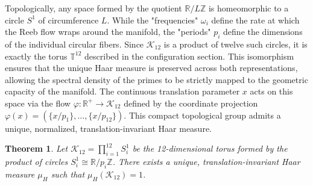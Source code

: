 \documentclass[sn-mathphys-num, pdflatex]{sn-jnl}
\newtheorem{theorem}{Theorem}[section]
\begin{document}
Topologically, any space formed by the quotient $\mathbb{R}/L\mathbb{Z}$ is homeomorphic to a circle $S^1$ of circumference $L$. While the "frequencies" $\omega_i$ define the rate at which the Reeb flow wraps around the manifold, the "periods" $p_i$ define the dimensions of the individual circular fibers. Since $\mathcal{K}_{12}$ is a product of twelve such circles, it is exactly the torus $\mathbb{T}^{12}$ described in the configuration section. This isomorphism ensures that the unique Haar measure is preserved across both representations, allowing the spectral density of the primes to be strictly mapped to the geometric capacity of the manifold.
The continuous translation parameter $x$ acts on this space via the flow $\varphi : \mathbb{R}^+ \to \mathcal{K}_{12}$ defined by the coordinate projection $\varphi(x) = ( \{x/p_1\}, \dots, \{x/p_{12}\} )$. This compact topological group admits a unique, normalized, translation-invariant Haar measure.
\begin{theorem}
Let $\mathcal{K}_{12} = \prod_{i=1}^{12} \label{K12} S^1_i$ be the 12-dimensional torus formed by the product of circles $S^1_i \cong \mathbb{R}/p_i\mathbb{Z}$. There exists a unique, translation-invariant Haar measure $\mu_H$ such that $\mu_H(\mathcal{K}_{12}) = 1$.
\end{theorem}
\end{document}
